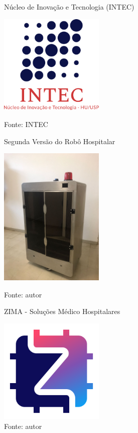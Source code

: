 \documentclass[../poliXuniversity_hospital_(USP)_report.tex]{subfiles}
\begin{document}
\begin{figure}[h]
\centering
    \begin{minipage}{0.3\textwidth}
        \caption{Núcleo de Inovação e Tecnologia (INTEC)}
        \centering %
        \includegraphics[width=5cm]{images/intec.png}
        \caption*{Fonte: INTEC}
        \label{fig: INTEC}
    \end{minipage}\hfill
    \begin{minipage}{0.3\textwidth}
        \centering
         \caption{Segunda Versão do Robô Hospitalar}
        \centering %
        \includegraphics[width=5cm]{images/v2_robo_hospitalar.jpeg}
        \caption*{Fonte: autor}
        \label{fig: Robo Hospitalar V2}
    \end{minipage}\hfill
    \begin{minipage}{0.3\textwidth}
        \centering
        \caption{ZIMA - Soluções Médico Hospitalares}
        \centering %
        \includegraphics[width=5cm]{images/logo_zima.png}
        \caption*{Fonte: autor}
        \label{fig: ZIMA}
    \end{minipage}\hfill
    
\end{figure}
\end{document}
